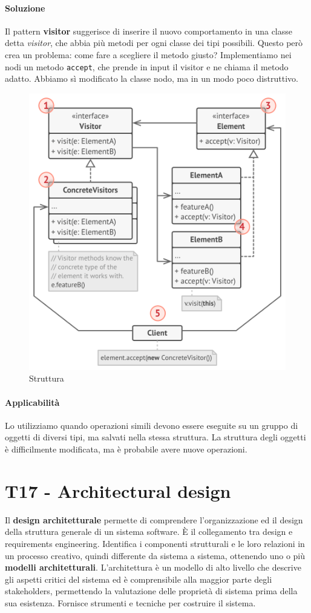 \documentclass[11pt]{article}
\newcommand{\code}[1]{\texttt{#1}}
\begin{document}
\paragraph{Soluzione}
Il pattern \textbf{visitor} suggerisce di inserire il nuovo comportamento in una classe detta \textit{visitor}, che abbia più metodi per ogni classe dei tipi possibili. Questo però crea un problema: come fare a scegliere il metodo giusto? Implementiamo nei nodi un metodo \code{accept}, che prende in input il visitor e ne chiama il metodo adatto. Abbiamo sì modificato la classe nodo, ma in un modo poco distruttivo. 
\begin{figure}[H]
    \includegraphics[width=\linewidth]{res/teoria/Visitor.png}
    \caption{Struttura}
\end{figure}
\paragraph{Applicabilità}
Lo utilizziamo quando operazioni simili devono essere eseguite su un gruppo di oggetti di diversi tipi, ma salvati nella stessa struttura. La struttura degli oggetti è difficilmente modificata, ma è probabile avere nuove operazioni. 
\section{T17 - Architectural design}
Il \textbf{design architetturale} permette di comprendere l'organizzazione ed il design della struttura generale di un sistema software. È il collegamento tra design e requirements engineering. Identifica i componenti strutturali e le loro relazioni in un processo creativo, quindi differente da sistema a sistema, ottenendo uno o più \textbf{modelli architetturali}. L'architettura è un modello di alto livello che descrive gli aspetti critici del sistema ed è comprensibile alla maggior parte degli stakeholders, permettendo la valutazione delle proprietà di sistema prima della sua esistenza. Fornisce strumenti e tecniche per costruire il sistema. 
\end{document}

